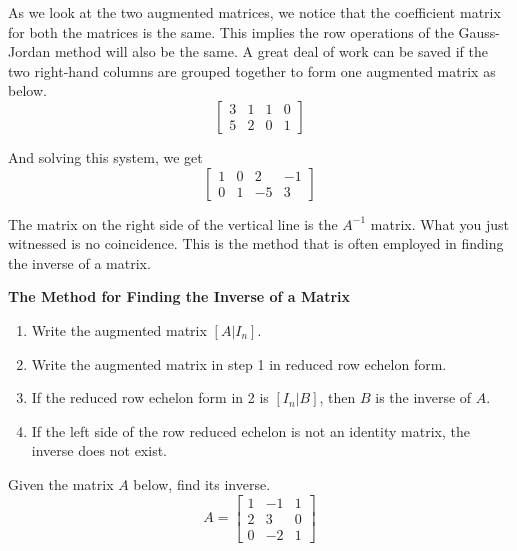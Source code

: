 As we look at the two augmented matrices, we notice that the coefficient matrix for both the matrices is the same. This implies the row operations of the Gauss-Jordan method will also be the same. A great deal of work can be saved if the two right-hand columns are grouped together to form one augmented matrix as below.
\[
    \left[
        \begin{array}{cc|cc}
            3 & 1 & 1 & 0 \\
            5 & 2 & 0 & 1
        \end{array}
        \right]
\]

And solving this system, we get
\[
    \left[
        \begin{array}{cc|cc}
            1 & 0 & 2  & -1 \\
            0 & 1 & -5 & 3
        \end{array}
        \right]
\]

The matrix on the right side of the vertical line is the \( A^{-1} \) matrix. What you just witnessed is no coincidence. This is the method that is often employed in finding the inverse of a matrix.

\begin{summarybox}
    \textbf{The Method for Finding the Inverse of a Matrix}
    \begin{enumerate}
        \item Write the augmented matrix $[ A | I_n ]$.
        \item Write the augmented matrix in step 1 in reduced row echelon form.
        \item If the reduced row echelon form in 2 is $[ I_n | B]$, then $B$ is the inverse of $A$.
        \item If the left side of the row reduced echelon is not an identity matrix, the inverse does not exist.
    \end{enumerate}

\end{summarybox}

\begin{example} \label{calculate_3x3_inverse}
    Given the matrix \( A \) below, find its inverse.
    \[ A = \begin{bmatrix}
            1 & -1 & 1 \\
            2 & 3  & 0 \\
            0 & -2 & 1
        \end{bmatrix} \]
\end{example}

